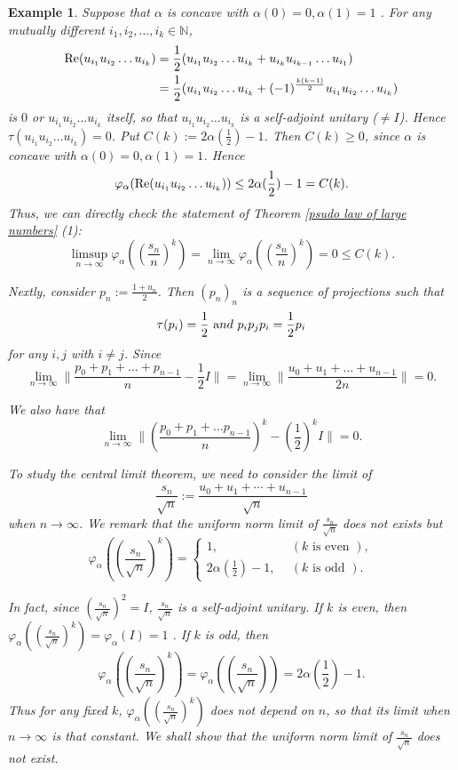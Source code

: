 \documentclass[a4paper,12pt]{amsart}
\newtheorem{example}[definition]{Example}
\newcommand{\N}{\mathbb{N}}
\begin{document}
\begin{example}
 
Suppose that $\alpha$ is concave with  $\alpha(0)=0, \alpha(1)=1$ .
For any mutually different $i_1, i_2, \dots, i_k \in \N$, 
\begin{align*}
{\rm Re} (u_{i_1}u_{i_2} \dots u_{i_k}) 
& = \frac{1}{2}(u_{i_1}u_{i_2} \dots u_{i_k} +  u_{i_k}u_{i_{k-1}} \dots u_{i_1}) \\
& = \frac{1}{2}(u_{i_1}u_{i_2} \dots u_{i_k} +  (-1)^{\frac{k(k-1)}{2}}u_{i_1}u_{i_2} \dots u_{i_k}) 
\end{align*}
is $0$ or $u_{i_1}u_{i_2} \dots u_{i_k}$ itself, so that $u_{i_1}u_{i_2} \dots u_{i_k}$ is a self-adjoint unitary ($\not= I$).  
Hence $\tau(u_{i_1}u_{i_2} \dots u_{i_k})= 0$.  Put $C(k):=  2\alpha(\frac{1}{2})-1$.  Then 
$C(k) \geq 0$, since $\alpha$ is concave with $\alpha(0)=0, \alpha(1)=1$.  Hence  
$$
\varphi_{\alpha}({\rm Re} (u_{i_1}u_{i_2} \dots u_{i_k}) ) \leq 2\alpha(\frac{1}{2})-1 =C(k).  
$$
Thus, we can directly check the statement of Theorem \ref{psudo law of large numbers}  (1):
\[   \limsup_{n\to\infty} \varphi_\alpha((\frac{s_n}{n})^k)= \lim_{n\to\infty} \varphi_\alpha((\frac{s_n}{n})^k) 
= 0 \leq C(k). \]

Nextly, consider $p_n := \frac{1 +u_n}{2}$. Then $(p_n)_n$ is a sequence of projections such that 
$$
\tau(p_i) = \frac{1}{2} \ {\text and} \ p_ip_jp_i = \frac{1}{2}p_i
$$
for any $i,j$ with $i\neq j$. 
Since 
\[   \lim_{n\to\infty} \|\frac{p_0 + p_1 + \dots + p_{n-1}}{n} - \frac{1}{2}  I \| =    
\lim_{n\to\infty} \|\frac{u_0 + u_1 + \dots + u_{n-1}}{2n} \|= 0. \]

We also have that 
\[   \lim_{n\to\infty} \|(\frac{p_0 + p_1 + \dots p_{n-1}}{n})^k - (\frac{1}{2})^kI \|= 0. \]

To study the central limit theorem, we need to consider the limit of  
$$
\frac{s_n}{\sqrt n} := \frac{u_0+u_1+\cdots +u_{n-1}}{{\sqrt n}}
$$ when 
$n \rightarrow \infty$.  We remark that the uniform norm limit of $\frac{s_n}{\sqrt n}$ does not exists but 
$$
\varphi_\alpha( (\frac{s_n}{\sqrt{n}})^k) = \begin{cases}
1, \ \ &  (k \text{ is even }), \\
2\alpha(\frac{1}{2})-1,\ \ &  (k \text{ is odd }).
\end{cases}
$$

In fact, since $(\frac{s_n}{\sqrt{n}} )^2 = I$, $\frac{s_n}{\sqrt{n}}$ is a self-adjoint unitary.  If $k$ is even, then 
$\varphi_\alpha( (\frac{s_n}{\sqrt{n}})^k) = \varphi_\alpha(I) = 1$ .  If $k$ is odd, then 
$$
\varphi_\alpha( (\frac{s_n}{\sqrt{n}})^k) = \varphi_\alpha( (\frac{s_n}{\sqrt{n}})) = 2\alpha(\frac{1}{2})-1. 
$$
Thus for any fixed $k$, $\varphi_\alpha( (\frac{s_n}{\sqrt{n}})^k)$ does not depend on $n$, so that  
its limit when $n \rightarrow \infty$ is that constant.  We shall show  that the uniform norm limit of 
$\frac{s_n}{\sqrt n}$ does not exist. 



\end{example}
\end{document}
